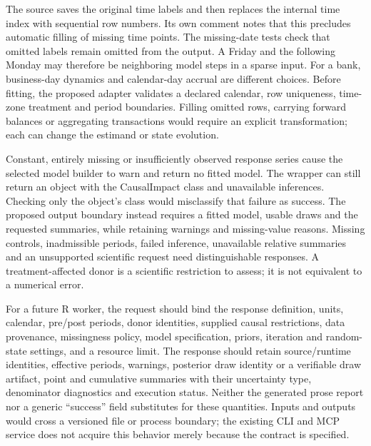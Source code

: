 The source saves the original time labels and then replaces the internal
time index with sequential row numbers. Its own comment notes that this
precludes automatic filling of missing time points. The missing-date tests
check that omitted labels remain omitted from the output. A Friday and the
following Monday may therefore be neighboring model steps in a sparse input.
For a bank, business-day dynamics and calendar-day accrual are different
choices. Before fitting, the proposed adapter validates a declared calendar,
row uniqueness, time-zone treatment and period boundaries. Filling omitted
rows, carrying forward balances or aggregating transactions would require
an explicit transformation; each can change the estimand or state evolution.
\cite{exec13_ci_semantics}

Constant, entirely missing or insufficiently observed response series cause
the selected model builder to warn and return no fitted model. The wrapper
can still return an object with the CausalImpact class and unavailable
inferences. Checking only the object's class would misclassify that failure
as success. The proposed output boundary instead requires a fitted model,
usable draws and the requested summaries, while retaining warnings and
missing-value reasons. Missing controls, inadmissible periods, failed
inference, unavailable relative summaries and an unsupported scientific
request need distinguishable responses. A treatment-affected donor is a
scientific restriction to assess; it is not equivalent to a numerical error.
\cite{exec13_ci_semantics,exec13_ci_reuse}

For a future R worker, the request should bind the response definition,
units, calendar, pre/post periods, donor identities, supplied causal
restrictions, data provenance, missingness policy, model specification,
priors, iteration and random-state settings, and a resource limit. The
response should retain source/runtime identities, effective periods,
warnings, posterior draw identity or a verifiable draw artifact, point and
cumulative summaries with their uncertainty type, denominator diagnostics
and execution status. Neither the generated prose report nor a generic
``success'' field substitutes for these quantities. Inputs and outputs would
cross a versioned file or process boundary; the existing CLI and MCP service
does not acquire this behavior merely because the contract is specified.
\cite{exec13_ci_reuse}

